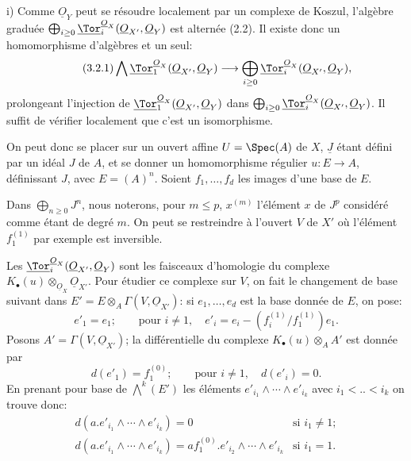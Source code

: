 
i)
Comme \(\underline{O}_Y\) peut se résoudre localement par un complexe de Koszul, l'algèbre graduée \(\bigoplus_{i\ge0}\underline{\Tor}_i^{\underline{O}_X}(\underline{O}_{X'},\underline{O}_Y)\) est alternée (2.2). Il existe donc un homomorphisme d'algèbres et un seul:
\begin{equation}\tag{3.2.1}
\bigwedge \underline{\Tor}_1^{\underline{O}_X}(\underline{O}_{X'},\underline{O}_Y)
\longrightarrow
\bigoplus_{i\ge0}\underline{\Tor}_i^{\underline{O}_X}(\underline{O}_{X'},\underline{O}_Y),
\end{equation}
prolongeant l'injection de \(\underline{\Tor}_1^{\underline{O}_X}(\underline{O}_{X'},\underline{O}_Y)\) dans
\(\bigoplus_{i\ge0}\underline{\Tor}_i^{\underline{O}_X}(\underline{O}_{X'},\underline{O}_Y)\). Il suffit de vérifier localement que c'est un isomorphisme.

On peut donc se placer sur un ouvert affine \(U=\Spec(A)\) de \(X\), \(\underline{J}\) étant défini par un idéal \(J\) de \(A\), et se donner un homomorphisme régulier \(u:E\to A\), définissant \(J\), avec \(E=(A)^n\). Soient \(f_1,\ldots,f_d\) les images d'une base de \(E\).

Dans \(\bigoplus_{n\ge0}J^n\), nous noterons, pour \(m\le p\), \(x^{(m)}\) l'élément \(x\) de \(J^p\) considéré comme étant de degré \(m\). On peut se restreindre à l'ouvert \(V\) de \(X'\) où l'élément \(f_1^{(1)}\) par exemple est inversible.

Les \(\underline{\Tor}_i^{\underline{O}_X}(\underline{O}_{X'},\underline{O}_Y)\) sont les faisceaux d'homologie du complexe \(K_\bullet(u)\otimes_{\underline{O}_X}\underline{O}_{X'}\). Pour étudier ce complexe sur \(V\), on fait le changement de base suivant dans \(E'=E\otimes_A\Gamma(V,\underline{O}_{X'})\): si \(e_1,\ldots,e_d\) est la base donnée de \(E\), on pose:
\[
e'_1=e_1;\qquad \text{pour }i\ne1,\quad
e'_i=e_i-(f_i^{(1)}/f_1^{(1)})e_1.
\]
Posons \(A'=\Gamma(V,\underline{O}_{X'})\); la différentielle du complexe \(K_\bullet(u)\otimes_A A'\) est donnée par
\[
d(e'_1)=f_1^{(0)};\qquad \text{pour }i\ne1,\quad d(e'_i)=0.
\]
En prenant pour base de \(\bigwedge^k(E')\) les éléments
\(e'_{i_1}\wedge\cdots\wedge e'_{i_k}\) avec \(i_1<..<i_k\) on trouve donc:
\[
\begin{array}{ll}
d(a.e'_{i_1}\wedge\cdots\wedge e'_{i_k})=0
&\text{si }i_1\ne1;\\[3pt]
d(a.e'_{i_1}\wedge\cdots\wedge e'_{i_k})=
af_1^{(0)}.e'_{i_2}\wedge\cdots\wedge e'_{i_k}
&\text{si }i_1=1.
\end{array}
\]
